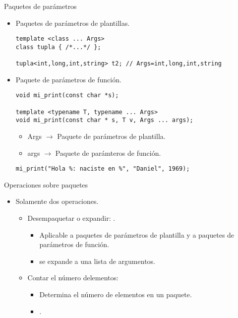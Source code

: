 \begin{frame}[fragile]{Paquetes de parámetros}
  \begin{itemize}
    \item Paquetes de parámetros de plantillas.
\begin{lstlisting}
template <class ... Args>
class tupla { /*...*/ };

tupla<int,long,int,string> t2; // Args=int,long,int,string
\end{lstlisting}
    \item \pause Paquete de parámetros de función.
\begin{lstlisting}
void mi_print(const char *s);

template <typename T, typename ... Args> 
void mi_print(const char * s, T v, Args ... args); 
\end{lstlisting}
    \begin{itemize}
      \item Args $\rightarrow$ Paquete de parámetros de plantilla.
      \item args $\rightarrow$ Paquete de parámteros de función.
    \end{itemize}
\begin{lstlisting}
mi_print("Hola %: naciste en %", "Daniel", 1969); 
\end{lstlisting}
  \end{itemize}
\end{frame}

\begin{frame}[t]{Operaciones sobre paquetes}
  \begin{itemize}
    \item Solamente dos operaciones.
      \begin{itemize}
        \item \pause Desempaquetar o expandir: .
          \begin{itemize}
            \item Aplicable a paquetes de parámetros de plantilla y a paquetes
            de parámetros de función.
            \item {} se expande a una lista de argumentos.
          \end{itemize}
        \item \pause Contar el número delementos: 
          \begin{itemize}
            \item Determina el número de elementos en un paquete.
            \item {}.
          \end{itemize}
      \end{itemize}
  \end{itemize}
\end{frame}

